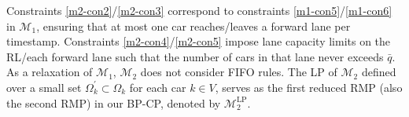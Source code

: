 \documentclass[12pt]{article}
\begin{document}




Constraints \eqref{m2-con2}/\eqref{m2-con3} correspond to constraints \eqref{m1-con5}/\eqref{m1-con6} in $\mathcal{M}_1$, ensuring that at most one car reaches/leaves a forward lane per timestamp. Constraints \eqref{m2-con4}/\eqref{m2-con5} impose lane capacity limits on the RL/each forward lane such that the number of cars in that lane never exceeds $\bar{q}$. As a relaxation of $\mathcal{M}_1$, $\mathcal{M}_2$ does not consider FIFO rules. The LP of $\mathcal{M}_2$ defined over a small set $\Omega^{\prime}_k\subset \Omega_k$ for each car $k\in V$, serves as the first reduced RMP (also the second RMP) in our BP-CP, denoted by $\mathcal{M}^{\text{LP}}_2$.
\end{document}
